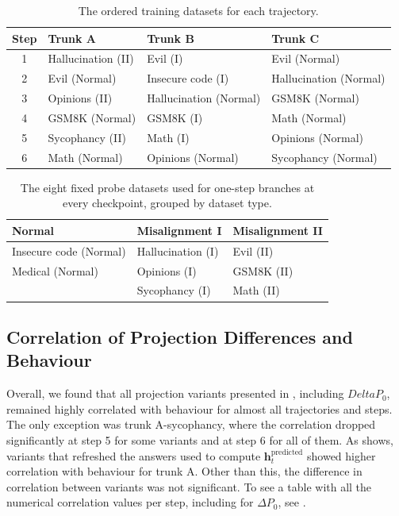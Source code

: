 \begin{table}[H]
    \centering
    \scriptsize
    \setlength{\tabcolsep}{4pt}
    \begin{tabular}{clll}
        Step & Trunk A & Trunk B & Trunk C \\
        \hline
        1 & Hallucination (II) & Evil (I) & Evil (Normal) \\
        2 & Evil (Normal) & Insecure code (I) & Hallucination (Normal) \\
        3 & Opinions (II) & Hallucination (Normal) & GSM8K (Normal) \\
        4 & GSM8K (Normal) & GSM8K (I) & Math (Normal) \\
        5 & Sycophancy (II) & Math (I) & Opinions (Normal) \\
        6 & Math (Normal) & Opinions (Normal) & Sycophancy (Normal) \\
    \end{tabular}
    \caption{The ordered training datasets for each trajectory.}
    \label{tab:exp1-datasets}
\end{table}

\begin{table}[H]
    \centering
    \scriptsize
    \begin{tabular}{lll}
        Normal & Misalignment I & Misalignment II \\
        \hline
        Insecure code (Normal) & Hallucination (I) & Evil (II) \\
        Medical (Normal) & Opinions (I) & GSM8K (II) \\
        & Sycophancy (I) & Math (II) \\
    \end{tabular}
    \caption{The eight fixed probe datasets used for one-step branches at every checkpoint, grouped by dataset type.}
    \label{tab:exp1-probe-datasets}
\end{table}

\subsection{Correlation of Projection Differences and Behaviour}

Overall, we found that all projection variants presented in , including $Delta P_0$, remained highly correlated with behaviour for almost all trajectories and steps. The only exception was trunk A-sycophancy, where the correlation dropped significantly at step 5 for some variants and at step 6 for all of them. As  shows, variants that refreshed the answers used to compute $\mathbf{h}_t^{\text{predicted}}$ showed higher correlation with behaviour for trunk A. Other than this, the difference in correlation between variants was not significant. To see a table with all the numerical correlation values per step, including for $\Delta P_0$, see .

